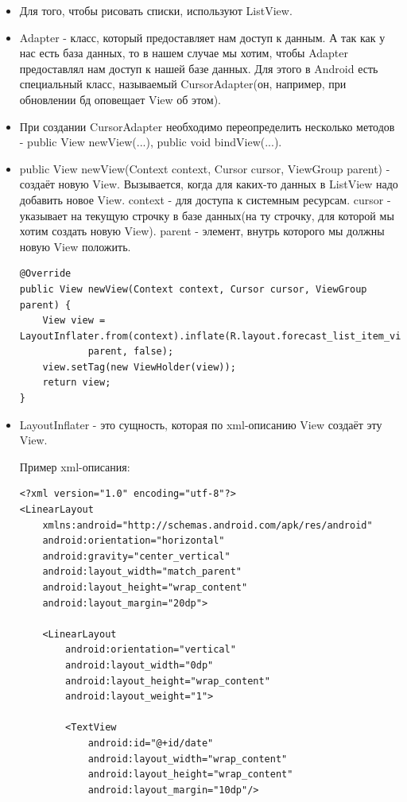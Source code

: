 \documentclass[12 pt]{article}
\begin{document}
    \begin{itemize}
        \item Для того, чтобы рисовать списки, используют ListView.
        \item Adapter - класс, который предоставляет нам доступ к данным. А так как у нас есть база данных, то в нашем случае мы хотим, чтобы Adapter предоставлял нам доступ к нашей базе данных. Для этого в Android есть специальный класс, называемый CursorAdapter(он, например, при обновлении бд оповещает View об этом).
        \item При создании CursorAdapter необходимо переопределить несколько методов - public View newView(...), public void bindView(...).
        \item public View newView(Context context, Cursor cursor, ViewGroup parent) - создаёт новую View. Вызывается, когда для каких-то данных в ListView надо добавить новое View. context - для доступа к системным ресурсам. cursor - указывает на текущую строчку в базе данных(на ту строчку, для которой мы хотим создать новую View). parent - элемент, внутрь которого мы должны новую View положить.
        \begin{lstlisting}
@Override
public View newView(Context context, Cursor cursor, ViewGroup parent) {
    View view = LayoutInflater.from(context).inflate(R.layout.forecast_list_item_view,
            parent, false);
    view.setTag(new ViewHolder(view));
    return view;
}        
        \end{lstlisting}
        \item LayoutInflater - это сущность, которая по xml-описанию View создаёт эту View. 
        
        Пример xml-описания:
        \begin{lstlisting}
<?xml version="1.0" encoding="utf-8"?>
<LinearLayout
    xmlns:android="http://schemas.android.com/apk/res/android"
    android:orientation="horizontal"
    android:gravity="center_vertical"
    android:layout_width="match_parent"
    android:layout_height="wrap_content"
    android:layout_margin="20dp">

    <LinearLayout
        android:orientation="vertical"
        android:layout_width="0dp"
        android:layout_height="wrap_content"
        android:layout_weight="1">

        <TextView
            android:id="@+id/date"
            android:layout_width="wrap_content"
            android:layout_height="wrap_content"
            android:layout_margin="10dp"/>


\end{lstlisting}
\end{itemize}
\end{document}
